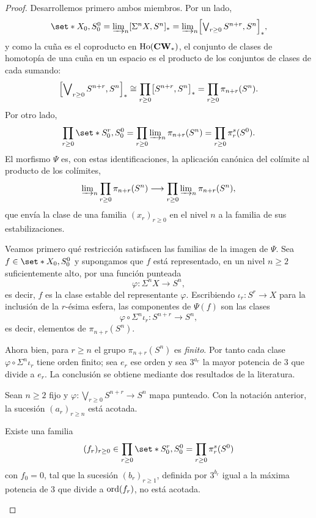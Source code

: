 \begin{proof}
Desarrollemos primero ambos miembros. Por un lado,
\[\textstyle
\set*{X_0,S^0_0}=\varinjlim\nolimits_n[\Sigma^nX,S^n]_*=\varinjlim\nolimits_n\Bigl[\bigvee_{r\ge0}S^{n+r},S^n\Bigr]_*,
\]
y como la cuña es el coproducto en $\operatorname{Ho}(\mathbf{CW}_*)$, el conjunto de clases de homotopía de una cuña en un espacio es el producto de los conjuntos de clases de cada sumando:
\[
\Bigl[\bigvee\nolimits_{r\ge0}S^{n+r},S^n\Bigr]_*\cong\prod_{r\ge0}\bigl[S^{n+r},S^n\bigr]_*=\prod_{r\ge0}\pi_{n+r}(S^n).
\]
Por otro lado,
\[
\prod_{r\ge0}\set*{S^r_0,S^0_0}=\prod_{r\ge0}\varinjlim\nolimits_n\pi_{n+r}(S^n)=\prod_{r\ge0}\pi_r^s(S^0).
\]
El morfismo $\Psi$ es, con estas identificaciones, la aplicación canónica del colímite al producto de los colímites,
\[
\varinjlim\nolimits_n\prod_{r\ge0}\pi_{n+r}(S^n)\longrightarrow\prod_{r\ge0}\varinjlim\nolimits_n\pi_{n+r}(S^n),
\]
que envía la clase de una familia $(x_r)_{r\ge0}$ en el nivel $n$ a la familia de sus estabilizaciones.

Veamos primero qué restricción satisfacen las familias de la imagen de $\Psi$. Sea $f\in\set*{X_0,S^0_0}$ y supongamos que $f$ está representado, en un nivel $n\geq2$ suficientemente alto, por una función punteada
\[
\varphi\colon\Sigma^nX\longrightarrow S^n,
\]
es decir, $f$ es la clase estable del representante $\varphi$. Escribiendo $\iota_r\colon S^r\to X$ para la inclusión de la $r$-ésima esfera, las componentes de $\Psi(f)$ son las clases
\[
\varphi\circ\Sigma^n\iota_r\colon S^{n+r}\longrightarrow S^n,
\]
es decir, elementos de $\pi_{n+r}(S^n)$.

Ahora bien, para $r\ge n$ el grupo $\pi_{n+r}(S^n)$ es \emph{finito}. 
Por tanto cada clase $\varphi\circ\Sigma^n\iota_r$ tiene orden finito; sea $e_r$ ese orden y sea $3^{a_r}$ la mayor potencia de $3$ que divide a $e_r$.
La conclusión se obtiene mediante dos resultados de la literatura.

\begin{teo}\label{teo:toda}
Sean $n\ge2$ fijo y $\varphi\colon\bigvee_{r\ge0}S^{n+r}\to S^n$ mapa punteado. Con la notación anterior, la sucesión $(a_r)_{r\ge n}$ está acotada.
\end{teo}

\begin{teo}\label{teo:milnor}
Existe una familia
\[
(f_r)_{r\ge0}\in\prod_{r\ge0}\set*{S^r_0,S^0_0}=\prod_{r\ge0}\pi_r^s(S^0)
\]
con $f_0=0$, tal que la sucesión $(b_r)_{r\ge1}$, definida por $3^{b_r}$ igual a la máxima potencia de $3$ que divide a $\operatorname{ord}(f_r)$, no está acotada.
\end{teo}


\end{proof}
